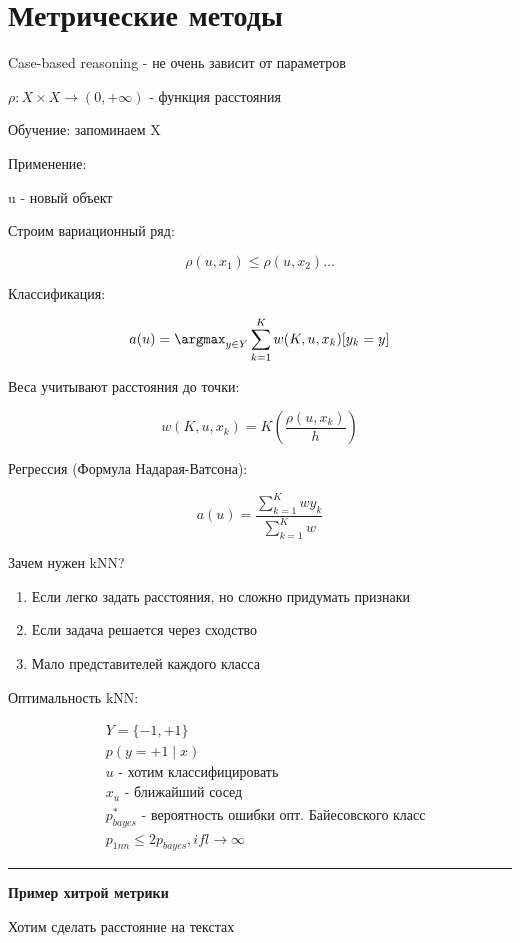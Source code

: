 \documentclass[a4paper, 12pt]{article}
\begin{document}
\section{Метрические методы}

Case-based reasoning - не очень зависит от параметров

$\rho: X \times X \rightarrow (0, + \infty)$ - функция расстояния

Обучение: запоминаем X

Применение:

u - новый объект

Строим вариационный ряд: 

\[\rho(u, x_1) \leq \rho(u, x_2) \ldots\]

Классификация:

\[a(u) = \argmax_{y \in Y} \sum_{k = 1}^K w(K, u, x_k) [y_k = y]\]

Веса учитывают расстояния до точки:

\[w(K, u, x_k) = K(\frac{\rho(u, x_k)}{h})\]

Регрессия (Формула Надарая-Ватсона):

\[a(u) = \frac{\sum_{k = 1}^K w y_k}{\sum_{k = 1}^K w}\]

Зачем нужен kNN?

\begin{enumerate}
    \item Если легко задать расстояния, 
    но сложно придумать признаки
    \item Если задача решается через сходство
    \item Мало представителей каждого класса
\end{enumerate}

Оптимальность kNN:

\begin{align*}
    & Y = \{-1, +1\} \\
    & p(y = +1 \mid x) \\
    & u \textrm{ - хотим классифицировать} \\
    & x_u \textrm{ - ближайший сосед} \\
    & p_{bayes}^* \textrm{ - вероятность ошибки 
    опт. Байесовского класс} \\
    & p_{1nn} \leq 2p_{bayes}, if l \to \infty
\end{align*}

\rule{\linewidth}{0.5pt}

\textbf{Пример хитрой метрики}

Хотим сделать расстояние на текстах
\end{document}
